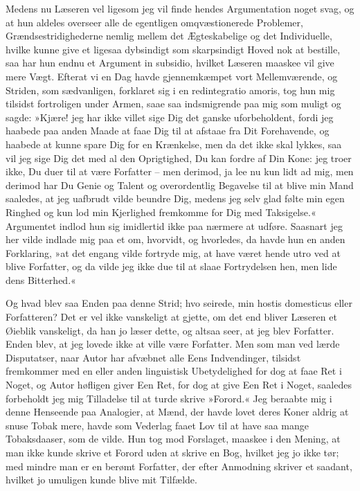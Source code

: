 \documentclass[12pt,a4paper]{article}
\begin{document}
Medens nu Læseren vel ligesom jeg vil finde hendes Argumentation noget svag, og at hun aldeles overseer alle de egentligen omqvæstionerede Problemer, Grændsestridighederne nemlig mellem det Ægteskabelige og det Individuelle, hvilke kunne give et ligesaa dybsindigt som skarpsindigt Hoved nok at bestille, saa har hun endnu et Argument in subsidio, hvilket Læseren maaskee vil give mere Vægt. Efterat vi en Dag havde gjennemkæmpet vort Mellemværende, og Striden, som sædvanligen, forklaret sig i en redintegratio amoris, tog hun mig tilsidst fortroligen under Armen, saae saa indsmigrende paa mig som muligt og sagde: »Kjære! jeg har ikke villet sige Dig det ganske uforbeholdent, fordi jeg haabede paa anden Maade at faae Dig til at afstaae fra Dit Forehavende, og haabede at kunne spare Dig for en Krænkelse, men da det ikke skal lykkes, saa vil jeg sige Dig det med al den Oprigtighed, Du kan fordre af Din Kone: jeg troer ikke, Du duer til at være Forfatter – men derimod, ja lee nu kun lidt ad mig, men derimod har Du Genie og Talent og overordentlig Begavelse til at blive min Mand saaledes, at jeg uafbrudt vilde beundre Dig, medens jeg selv glad følte min egen Ringhed og kun lod min Kjerlighed fremkomme for Dig med Taksigelse.« Argumentet indlod hun sig imidlertid ikke paa nærmere at udføre. Saasnart jeg her vilde indlade mig paa et om, hvorvidt, og hvorledes, da havde hun en anden Forklaring, »at det engang vilde fortryde mig, at have været hende utro ved at blive Forfatter, og da vilde jeg ikke due til at slaae Fortrydelsen hen, men lide dens Bitterhed.«

Og hvad blev saa Enden paa denne Strid; hvo seirede, min hostis domesticus eller Forfatteren? Det er vel ikke vanskeligt at gjette, om det end bliver Læseren et Øieblik vanskeligt, da han jo læser dette, og altsaa seer, at jeg blev Forfatter. Enden blev, at jeg lovede ikke at ville være Forfatter. Men som man ved lærde Disputatser, naar Autor har afvæbnet alle Eens Indvendinger, tilsidst fremkommer med en eller anden linguistisk Ubetydelighed for dog at faae Ret i Noget, og Autor høfligen giver Een Ret, for dog at give Een Ret i Noget, saaledes forbeholdt jeg mig Tilladelse til at turde skrive »Forord.« Jeg beraabte mig i denne Henseende paa Analogier, at Mænd, der havde lovet deres Koner aldrig at snuse Tobak mere, havde som Vederlag faaet Lov til at have saa mange Tobaksdaaser, som de vilde. Hun tog mod Forslaget, maaskee i den Mening, at man ikke kunde skrive et Forord uden at skrive en Bog, hvilket jeg jo ikke tør; med mindre man er en berømt Forfatter, der efter Anmodning skriver et saadant, hvilket jo umuligen kunde blive mit Tilfælde.
\end{document}
